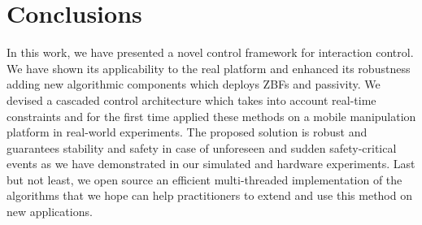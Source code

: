 \section{Conclusions} \label{sec:conclusions}

In this work, we have presented a novel control framework for interaction control. We have shown its applicability to the real platform and enhanced its robustness adding new algorithmic components which deploys ZBFs and passivity. We devised a cascaded control architecture which takes into account real-time constraints and for the first time applied these methods on a mobile manipulation platform in real-world experiments. The proposed solution is robust and guarantees stability and safety in case of unforeseen and sudden safety-critical events as we have demonstrated in our simulated and hardware experiments. Last but not least, we open source an efficient multi-threaded implementation of the algorithms that we hope can help practitioners to extend and use this method on new applications.



